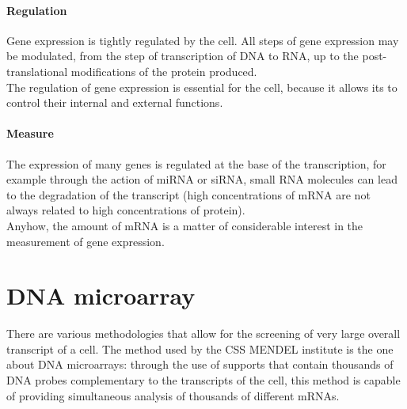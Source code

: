 \documentclass[a4paper]{report}
\begin{document}
\paragraph{Regulation}
Gene expression is tightly regulated by the cell. All steps of gene expression may be modulated, from the step of transcription of DNA to RNA, up to the post-translational modifications of the protein produced.\\
The regulation of gene expression is essential for the cell, because it allows its to control their internal and external functions.
\paragraph{Measure}
The expression of many genes is regulated at the base of the transcription, for example through the action of miRNA or siRNA, small RNA molecules can lead to the degradation of the transcript (high concentrations of mRNA are not always related to high concentrations of protein).\\
Anyhow, the amount of mRNA is a matter of considerable interest in the measurement of gene expression.
\section{DNA microarray}
There are various methodologies that allow for the screening of very large overall transcript of a cell. The method used by the CSS MENDEL institute is the one about DNA microarrays: through the use of supports that contain thousands of DNA probes complementary to the transcripts of the cell, this method is capable of providing simultaneous analysis of thousands of different mRNAs.\\
\end{document}
